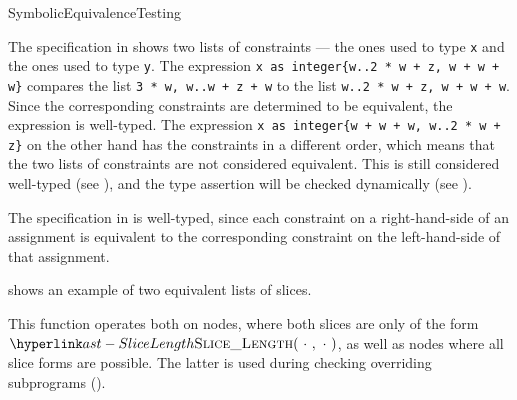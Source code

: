 \begin{TypingRuleList}{SymbolicEquivalenceTesting}


The specification in 
shows two lists of constraints --- the ones used to type \verb|x| and the ones used to type \verb|y|.
The expression \verb|x as integer{w..2 * w + z, w + w + w}|
compares the list \verb|3 * w, w..w + z + w| to the list \verb|w..2 * w + z, w + w + w|.
Since the corresponding constraints are determined to be equivalent,
the expression is well-typed.
The expression \verb|x as integer{w + w + w, w..2 * w + z}| on the other hand
has the constraints in a different order, which means that the two lists of constraints
are not considered equivalent. This is still considered well-typed (see ),
and the type assertion will be checked dynamically (see ).




The specification in  is well-typed,
since each constraint on a right-hand-side of an assignment is equivalent to the
corresponding constraint on the left-hand-side of that assignment.




 shows an example of two equivalent lists of slices.




This function operates both on \typedast{} nodes, where both slices are only
of the form $\SliceLength(\ \cdot\ ,\ \cdot\ )$, as well as \untypedast{} nodes where all slice forms
are possible. The latter is used during checking overriding subprograms ().


\end{TypingRuleList}
